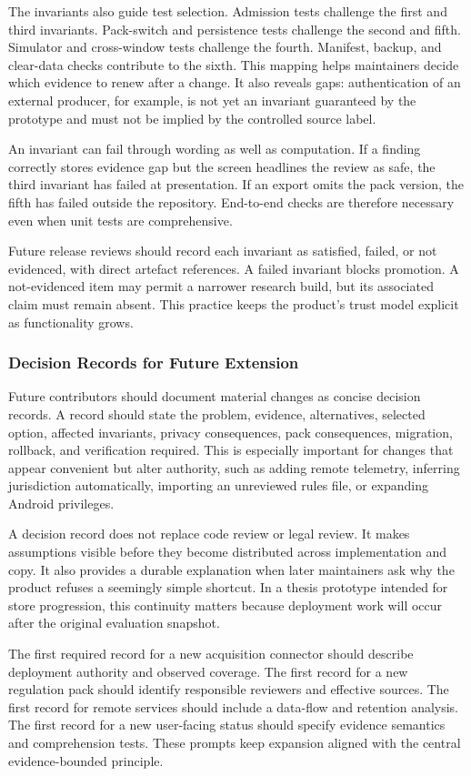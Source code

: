 The invariants also guide test selection. Admission tests challenge the first and third invariants. Pack-switch and persistence tests challenge the second and fifth. Simulator and cross-window tests challenge the fourth. Manifest, backup, and clear-data checks contribute to the sixth. This mapping helps maintainers decide which evidence to renew after a change. It also reveals gaps: authentication of an external producer, for example, is not yet an invariant guaranteed by the prototype and must not be implied by the controlled source label.

An invariant can fail through wording as well as computation. If a finding correctly stores evidence gap but the screen headlines the review as safe, the third invariant has failed at presentation. If an export omits the pack version, the fifth has failed outside the repository. End-to-end checks are therefore necessary even when unit tests are comprehensive.

Future release reviews should record each invariant as satisfied, failed, or not evidenced, with direct artefact references. A failed invariant blocks promotion. A not-evidenced item may permit a narrower research build, but its associated claim must remain absent. This practice keeps the product's trust model explicit as functionality grows.

\subsubsection{Decision Records for Future Extension}

Future contributors should document material changes as concise decision records. A record should state the problem, evidence, alternatives, selected option, affected invariants, privacy consequences, pack consequences, migration, rollback, and verification required. This is especially important for changes that appear convenient but alter authority, such as adding remote telemetry, inferring jurisdiction automatically, importing an unreviewed rules file, or expanding Android privileges.

A decision record does not replace code review or legal review. It makes assumptions visible before they become distributed across implementation and copy. It also provides a durable explanation when later maintainers ask why the product refuses a seemingly simple shortcut. In a thesis prototype intended for store progression, this continuity matters because deployment work will occur after the original evaluation snapshot.

The first required record for a new acquisition connector should describe deployment authority and observed coverage. The first record for a new regulation pack should identify responsible reviewers and effective sources. The first record for remote services should include a data-flow and retention analysis. The first record for a new user-facing status should specify evidence semantics and comprehension tests. These prompts keep expansion aligned with the central evidence-bounded principle.
